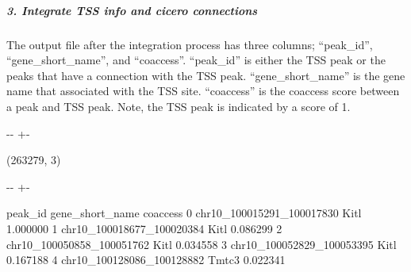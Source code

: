 \documentclass[letterpaper,10pt,english]{sphinxmanual}
\newlength\nbsphinxcodecellspacing
\begin{document}
\subparagraph{3. Integrate TSS info and cicero connections}
\label{\detokenize{notebooks/01_ATAC-seq_data_processing/option1_scATAC-seq_data_analysis_with_cicero/02_preprocess_peak_data:3.-Integrate-TSS-info-and-cicero-connections}}
The output file after the integration process has three columns; “peak\_id”, “gene\_short\_name”, and “coaccess”. “peak\_id” is either the TSS peak or the peaks that have a connection with the TSS peak. “gene\_short\_name” is the gene name that associated with the TSS site. “coaccess” is the co\sphinxhyphen{}access score between a peak and TSS peak. Note, the TSS peak is indicated by a score of 1.

{
\begin{sphinxVerbatim}[commandchars=\\\{\}]
\llap{\color{nbsphinxin}[8]:\,\hspace{\fboxrule}\hspace{\fboxsep}}  
\end{sphinxVerbatim}
}

{

\kern-\sphinxverbatimsmallskipamount\kern-\baselineskip
\kern+\FrameHeightAdjust\kern-\fboxrule
\vspace{\nbsphinxcodecellspacing}

\begin{sphinxVerbatim}[commandchars=\\\{\}]
(263279, 3)
\end{sphinxVerbatim}
}

{

\kern-\sphinxverbatimsmallskipamount\kern-\baselineskip
\kern+\FrameHeightAdjust\kern-\fboxrule
\vspace{\nbsphinxcodecellspacing}

\begin{sphinxVerbatim}[commandchars=\\\{\}]
\llap{\color{nbsphinxout}[8]:\,\hspace{\fboxrule}\hspace{\fboxsep}}                     peak\_id gene\_short\_name  coaccess
0  chr10\_100015291\_100017830            Kitl  1.000000
1  chr10\_100018677\_100020384            Kitl  0.086299
2  chr10\_100050858\_100051762            Kitl  0.034558
3  chr10\_100052829\_100053395            Kitl  0.167188
4  chr10\_100128086\_100128882           Tmtc3  0.022341
\end{sphinxVerbatim}
}
\end{document}
